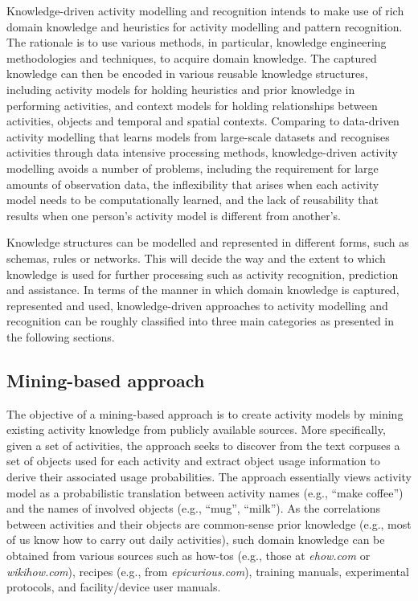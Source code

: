 Knowledge-driven activity modelling and recognition intends to make use of rich domain knowledge and heuristics for activity modelling and pattern recognition. The rationale is to use various methods, in particular, knowledge engineering methodologies and techniques, to acquire domain knowledge. The captured knowledge can then be encoded in various reusable knowledge structures, including activity models for holding heuristics and prior knowledge in performing activities, and context models for holding relationships between activities, objects and temporal and spatial contexts. Comparing to data-driven activity modelling that learns models from large-scale datasets and recognises activities through data intensive processing methods, knowledge-driven activity modelling avoids a number of problems, including the requirement for large amounts of observation data, the inflexibility that arises when each activity model needs to be computationally learned, and the lack of reusability that results when one person’s activity model is different from another’s. 

Knowledge structures can be modelled and represented in different forms, such as schemas, rules or networks. This will decide the way and the extent to which knowledge is used for further processing such as activity recognition, prediction and assistance. In terms of the manner in which domain knowledge is captured, represented and used, knowledge-driven approaches to activity modelling and recognition can be roughly classified into three main categories as presented in the following sections.

\subsection{Mining-based approach}

The objective of a mining-based approach is to create activity models by mining existing activity knowledge from publicly available sources. More specifically, given a set of activities, the approach seeks to discover from the text corpuses a set of objects used for each activity and extract object usage information to derive their associated usage probabilities. The approach essentially views activity model as a probabilistic translation between activity names (e.g., “make coffee”) and the names of involved objects (e.g., “mug”, “milk”). As the correlations between activities and their objects are common-sense prior knowledge (e.g., most of us know how to carry out daily activities), such domain knowledge can be obtained from various sources such as how-tos (e.g., those at \textit{ehow.com} or \textit{wikihow.com}), recipes (e.g., from \textit{epicurious.com}), training manuals, experimental protocols, and facility/device user manuals.

